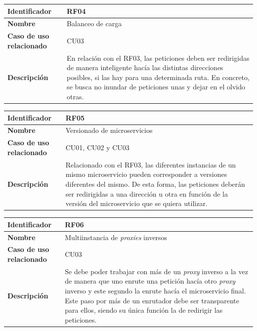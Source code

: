 \documentclass[11pt,spanish,listoffigures]{tfgetsinf}
\begin{document}
\begin{center} \begin{tabular}{| l | p{9.5cm} |}
\hline
\textbf{Identificador} & RF04
\\ \hline
\textbf{Nombre} & Balanceo de carga
\\ \hline
\textbf{Caso de uso relacionado} & CU03
\\ \hline
\textbf{Descripción} & En relación con el RF03, las peticiones deben ser redirigidas de manera inteligente hacía las distintas direcciones posibles, si las hay para una determinada ruta. En concreto, se busca no inundar de peticiones unas y dejar en el olvido otras.
\\ \hline \end{tabular} \end{center}

\begin{center} \begin{tabular}{| l | p{9.5cm} |}
\hline
\textbf{Identificador} & RF05
\\ \hline
\textbf{Nombre} & Versionado de microservicios
\\ \hline
\textbf{Caso de uso relacionado} & CU01, CU02 y CU03
\\ \hline
\textbf{Descripción} & Relacionado con el RF03, las diferentes instancias de un mismo microservicio pueden corresponder a versiones diferentes del mismo. De esta forma, las peticiones deberán ser redirigidas a una dirección u otra en función de la versión del microservicio que se quiera utilizar.
\\ \hline \end{tabular} \end{center}

\begin{center} \begin{tabular}{| l | p{9.5cm} |}
\hline
\textbf{Identificador} & RF06
\\ \hline
\textbf{Nombre} & Multiinstancia de \emph{proxies} inversos
\\ \hline
\textbf{Caso de uso relacionado} & CU03
\\ \hline
\textbf{Descripción} & Se debe poder trabajar con más de un \emph{proxy} inverso a la vez de manera que uno enrute una petición hacía otro \emph{proxy} inverso y este segundo la enrute hacía el microservicio final. Este paso por más de un enrutador debe ser transparente para ellos, siendo su única función la de redirigir las peticiones.
\\ \hline \end{tabular} \end{center}
\end{document}
